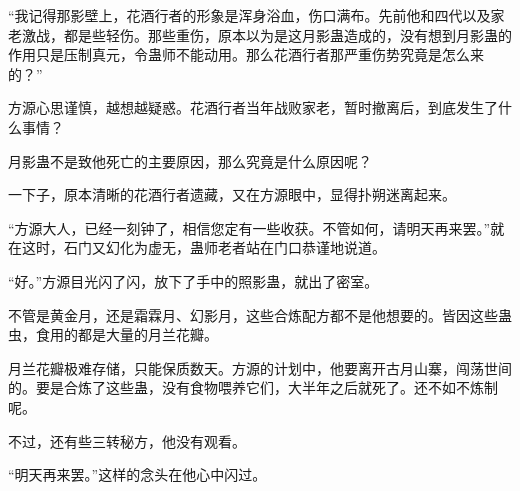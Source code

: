 \begin{this_body}
“我记得那影壁上，花酒行者的形象是浑身浴血，伤口满布。先前他和四代以及家老激战，都是些轻伤。那些重伤，原本以为是这月影蛊造成的，没有想到月影蛊的作用只是压制真元，令蛊师不能动用。那么花酒行者那严重伤势究竟是怎么来的？”

方源心思谨慎，越想越疑惑。花酒行者当年战败家老，暂时撤离后，到底发生了什么事情？

月影蛊不是致他死亡的主要原因，那么究竟是什么原因呢？

一下子，原本清晰的花酒行者遗藏，又在方源眼中，显得扑朔迷离起来。

“方源大人，已经一刻钟了，相信您定有一些收获。不管如何，请明天再来罢。”就在这时，石门又幻化为虚无，蛊师老者站在门口恭谨地说道。

“好。”方源目光闪了闪，放下了手中的照影蛊，就出了密室。

不管是黄金月，还是霜霖月、幻影月，这些合炼配方都不是他想要的。皆因这些蛊虫，食用的都是大量的月兰花瓣。

月兰花瓣极难存储，只能保质数天。方源的计划中，他要离开古月山寨，闯荡世间的。要是合炼了这些蛊，没有食物喂养它们，大半年之后就死了。还不如不炼制呢。

不过，还有些三转秘方，他没有观看。

“明天再来罢。”这样的念头在他心中闪过。

\end{this_body}

